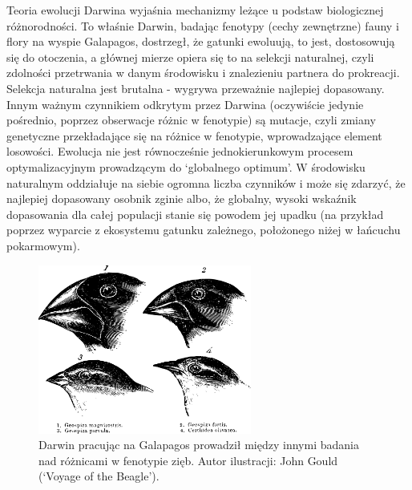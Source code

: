 \documentclass[a4paper,12pt]{article}
\numberwithin{figure}{section}
\begin{document}
    Teoria ewolucji Darwina wyjaśnia mechanizmy leżące u podstaw biologicznej różnorodności. To właśnie Darwin, badając fenotypy (cechy zewnętrzne) fauny i flory na wyspie Galapagos, dostrzegł, że gatunki ewoluują, to jest, dostosowują się do otoczenia, a głównej mierze opiera się to na selekcji naturalnej, czyli zdolności przetrwania w danym środowisku i znalezieniu partnera do prokreacji. Selekcja naturalna jest brutalna - wygrywa przeważnie najlepiej dopasowany. Innym ważnym czynnikiem odkrytym przez Darwina (oczywiście jedynie pośrednio, poprzez obserwacje różnic w fenotypie) są mutacje, czyli zmiany genetyczne przekładające się na różnice w fenotypie, wprowadzające element losowości. Ewolucja nie jest równocześnie jednokierunkowym procesem optymalizacyjnym prowadzącym do `globalnego optimum'. W środowisku naturalnym oddziałuje na siebie ogromna liczba czynników i może się zdarzyć, że najlepiej dopasowany osobnik zginie albo, że globalny, wysoki wskaźnik dopasowania dla całej populacji stanie się powodem jej upadku (na przykład poprzez wyparcie z ekosystemu gatunku zależnego, położonego niżej w łańcuchu pokarmowym)\cite{IntroductionToEvolutionaryComputing2015}.

    \bigskip

    \begin{figure}[H]
        \centering
        \includegraphics[width=7cm]{darwin_birds}
        \caption{Darwin pracując na Galapagos prowadził między innymi badania nad różnicami w fenotypie zięb. Autor ilustracji: John Gould (`Voyage of the Beagle').}
        \label{fig:darwin_birds}
    \end{figure}

    \bigskip
\end{document}
